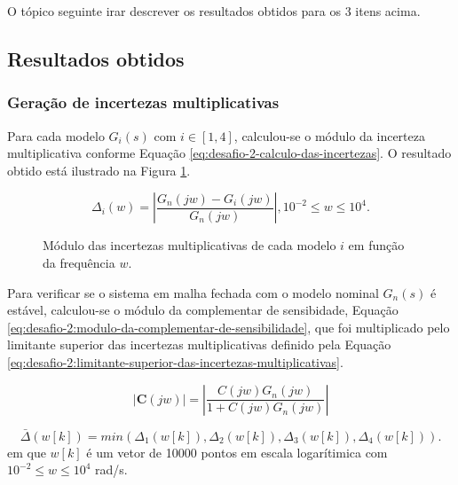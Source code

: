 O tópico seguinte irar descrever os resultados obtidos para os 3 itens acima.

\subsection{Resultados obtidos}
\subsubsection{Geração de incertezas multiplicativas}
\label{subsub:geracao-de-incertezas-multiplicativas}
Para cada modelo $G_{i}(s)$ com $i \in [1,4]$, calculou-se o módulo da incerteza
multiplicativa conforme Equação \ref{eq:desafio-2-calculo-das-incertezas}. O
resultado obtido está ilustrado na Figura
\ref{fig:desafio-2-resultado-questao-1}.

\begin{equation}
    \label{eq:desafio-2-calculo-das-incertezas}
    \Delta_{i}(w) = \left | \frac{G_{n}(jw) - G_{i}(jw)}{G_{n}(jw)} \right |,
    10^{-2} \leq w \leq 10^{4}.
\end{equation}

\begin{figure}[!ht]
    \caption{Módulo das incertezas multiplicativas de cada modelo $i$ em
    função da frequência $w$.}
    \vspace{-10pt}
    \hspace{-30pt}
    \label{fig:desafio-2-resultado-questao-1}
    \begin{minipage}{\linewidth}
        
    \end{minipage}
\end{figure}

Para verificar se o sistema em malha fechada com o modelo nominal $G_{n}(s)$ é
estável, calculou-se o módulo da complementar de sensibidade, Equação
\ref{eq:desafio-2:modulo-da-complementar-de-sensibilidade}, que foi multiplicado
pelo limitante superior das incertezas multiplicativas definido pela Equação
\ref{eq:desafio-2:limitante-superior-das-incertezas-multiplicativas}.

\begin{equation}
    \label{eq:desafio-2:modulo-da-complementar-de-sensibilidade}
    |\boldsymbol{C}(jw)| = \left | \frac{C(jw)G_{n}(jw)}{1 + C(jw)G_{n}(jw)} \right |
\end{equation}

\begin{equation}
    \label{eq:desafio-2:limitante-superior-das-incertezas-multiplicativas}
    \bar{\Delta}(w[k]) = min(\Delta_{1}(w[k]), \Delta_{2}(w[k]), \Delta_{3}(w[k]),
    \Delta_{4}(w[k])). 
\end{equation}
em que $w[k]$ é um vetor de 10000 pontos em escala logarítimica com $10^{-2}
\leq w \leq 10^{4}$ rad/s.

